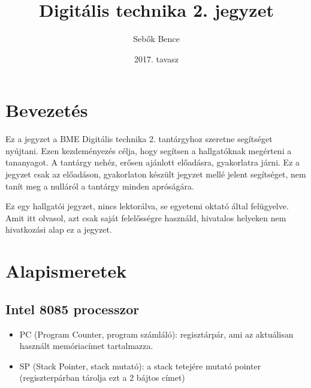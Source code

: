 \documentclass{article}
\begin{document}
\title{Digitális technika 2. jegyzet}
\author{Sebők Bence}
\date{2017. tavasz}

\maketitle

\renewcommand{\contentsname}{Tartalomjegyzék}
\tableofcontents

\newpage %

\section{Bevezetés}
Ez a jegyzet a BME Digitális technika 2. tantárgyhoz szeretne segítséget nyújtani. Ezen kezdeményezés célja, hogy segítsen a hallgatóknak megérteni a tananyagot. A tantárgy nehéz, erősen ajánlott előadásra, gyakorlatra járni. Ez a jegyzet csak az előadáson, gyakorlaton készült jegyzet mellé jelent segítséget, nem tanít meg a nulláról a tantárgy minden apróságára.

Ez egy hallgatói jegyzet, nincs lektorálva, se egyetemi oktató által felügyelve. Amit itt olvasol, azt csak saját felelősségre használd, hivatalos helyeken nem hivatkozási alap ez a jegyzet.

\newpage %

\section{Alapismeretek}
\subsection{Intel 8085 processzor}
\begin{itemize}
	\item PC (Program Counter, program számláló): regisztárpár, ami az aktuálisan használt memóriacímet tartalmazza.
	\item SP (Stack Pointer, stack mutató): a stack tetejére mutató pointer (regiszterpárban tárolja ezt a 2 bájtos címet)
\end{itemize}
\end{document}
